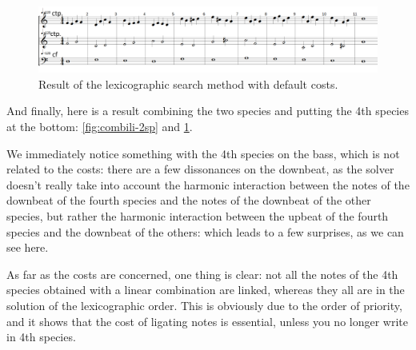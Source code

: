 \begin{figure}[h]
    \centering
    \includegraphics[width=1\textwidth]{Images/Experiments/basic-lexico-2sp.png}
    \caption{Result of the lexicographic search method with default costs.}
    \label{fig:lexico-2sp}
\end{figure}
 
And finally, here is a result combining the two species and putting the 4th species at the bottom: \ref{fig:combili-2sp} and \ref{fig:lexico-2sp}.

We immediately notice something with the 4th species on the bass, which is not related to the costs: there are a few dissonances on the downbeat, as the solver doesn't really take into account the harmonic interaction between the notes of the downbeat of the fourth species and the notes of the downbeat of the other species, but rather the harmonic interaction between the upbeat of the fourth species and the downbeat of the others: which leads to a few surprises, as we can see here.

As far as the costs are concerned, one thing is clear: not all the notes of the 4th species obtained with a linear combination are linked, whereas they all are in the solution of the lexicographic order. This is obviously due to the order of priority, and it shows that the cost of ligating notes is essential, unless you no longer write in 4th species.

